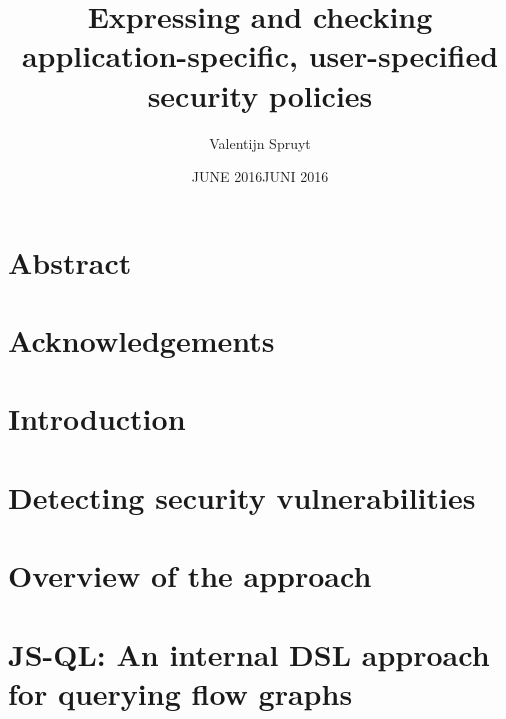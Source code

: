 \documentclass[a4paper, 12pt]{report}
\author{Valentijn Spruyt}
\title{Expressing and checking application-specific, user-specified security policies}
\date{JUNE 2016}
\begin{document}
\maketitlepage
 
 
\date{JUNI 2016}
 
\maketitlepage


\chapter*{Abstract}
 
 
 
\chapter*{Acknowledgements}
 
\tableofcontents



\chapter{Introduction}



\chapter{Detecting security vulnerabilities}
\label{ch:Background}

 
\chapter{Overview of the approach}
\label{ch:Overview}


\chapter{JS-QL: An internal DSL approach for querying flow graphs}
\label{ch:JSQL}

 
\end{document}
